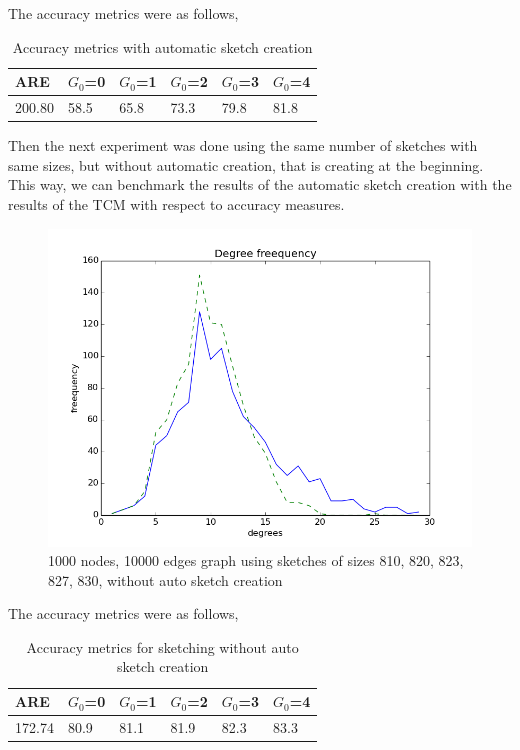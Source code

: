 \documentclass[12pt]{report}
\numberwithin{figure}{section}
\numberwithin{table}{section}
\begin{document}
The accuracy metrics were as follows, 

\begin{table}[H]
\centering
\begin{tabular}{|l|l|l|l|l|l|}
\hline
 ARE   & $G_0$=0 & $G_0$=1 & $G_0$=2 &  $G_0$=3 & $G_0$=4 \\ \hline
200.80 &   58.5  &  65.8   &   73.3  &   79.8   &   81.8 \\ \hline
\end{tabular}
\caption{Accuracy metrics with automatic sketch creation}
\end{table}

Then the next experiment was done using the same number of sketches with same sizes, but without automatic creation, that is creating at the beginning. This way, we can benchmark the results of the automatic sketch creation with the results of the TCM with respect to accuracy measures. 

\begin{figure}[H]
\centering
\includegraphics[scale=0.6]{images/MS-n1000-e10000-sketches-811-821-823-827-829plot}
\caption{1000 nodes, 10000 edges graph using sketches of sizes 810, 820, 823, 827, 830, without auto sketch creation}
\end{figure}

The accuracy metrics were as follows,

\begin{table}[H]
\centering
\begin{tabular}{|l|l|l|l|l|l|}
\hline
 ARE   & $G_0$=0 & $G_0$=1 & $G_0$=2 & $G_0$=3 & $G_0$=4\\ \hline
172.74 &   80.9  &   81.1  &   81.9  &   82.3  & 83.3   \\ \hline
\end{tabular}
\caption{Accuracy metrics for sketching without auto sketch creation}
\end{table}
\end{document}
